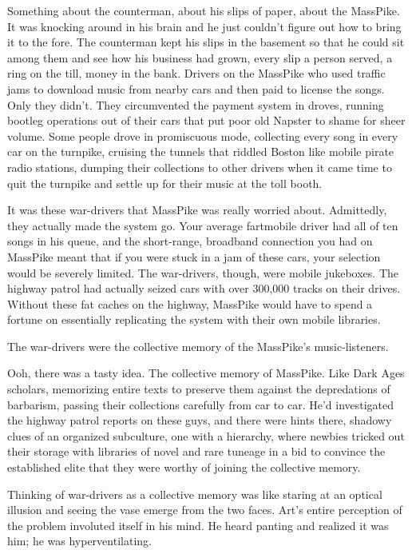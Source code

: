 Something about the counterman, about his slips of paper, about the
MassPike. It was knocking around in his brain and he just couldn’t
figure out how to bring it to the fore. The counterman kept his
slips in the basement so that he could sit among them and see how
his business had grown, every slip a person served, a ring on the
till, money in the bank. Drivers on the MassPike who used traffic
jams to download music from nearby cars and then paid to license
the songs. Only they didn’t. They circumvented the payment system
in droves, running bootleg operations out of their cars that put
poor old Napster to shame for sheer volume. Some people drove in
promiscuous mode, collecting every song in every car on the
turnpike, cruising the tunnels that riddled Boston like mobile
pirate radio stations, dumping their collections to other drivers
when it came time to quit the turnpike and settle up for their
music at the toll booth.

It was these war-drivers that MassPike was really worried about.
Admittedly, they actually made the system go. Your average
fartmobile driver had all of ten songs in his queue, and the
short-range, broadband connection you had on MassPike meant that if
you were stuck in a jam of these cars, your selection would be
severely limited. The war-drivers, though, were mobile jukeboxes.
The highway patrol had actually seized cars with over 300,000
tracks on their drives. Without these fat caches on the highway,
MassPike would have to spend a fortune on essentially replicating
the system with their own mobile libraries.

The war-drivers were the collective memory of the MassPike’s
music-listeners.

Ooh, there was a tasty idea. The collective memory of MassPike.
Like Dark Ages scholars, memorizing entire texts to preserve them
against the depredations of barbarism, passing their collections
carefully from car to car. He’d investigated the highway patrol
reports on these guys, and there were hints there, shadowy clues of
an organized subculture, one with a hierarchy, where newbies
tricked out their storage with libraries of novel and rare tuneage
in a bid to convince the established elite that they were worthy of
joining the collective memory.

Thinking of war-drivers as a collective memory was like staring at
an optical illusion and seeing the vase emerge from the two faces.
Art’s entire perception of the problem involuted itself in his
mind. He heard panting and realized it was him; he was
hyperventilating.

